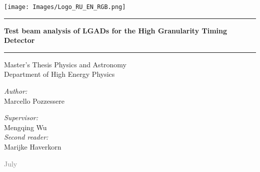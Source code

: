 \begin{titlepage}
    \begin{center}
        \texttt{[image: Images/Logo\_RU\_EN\_RGB.png]}

        \vspace{1cm}
        
        \rule{\textwidth}{1pt}
        \par
        \vspace{1cm}
        {\Huge\bfseries Test beam analysis of LGADs for the High Granularity Timing Detector}
        \vspace{1cm}
        \par
        \rule{\textwidth}{1pt}
        
        \vspace{1cm}
        
        \LARGE
        Master's Thesis Physics and Astronomy \\
        \vspace{.5cm}
        Department of High Energy Physics
            
        \vspace{2.5cm}
            
        \noindent
        \begin{minipage}[t]{0.48\textwidth}
        \raggedright
            \textit{Author:}\\
            Marcello Pozzessere
        \end{minipage}
        \hfill
        \begin{minipage}[t]{0.48\textwidth}
            \raggedleft
            \textit{Supervisor:}\\
            Mengqing Wu \\
            \vspace{.5cm}
            \textit{Second reader:}\\
            Marijke Haverkorn
        
        \end{minipage}
        \vfill
        \textcolor{gray}{\Large July \the\year}
    \end{center}
\end{titlepage}